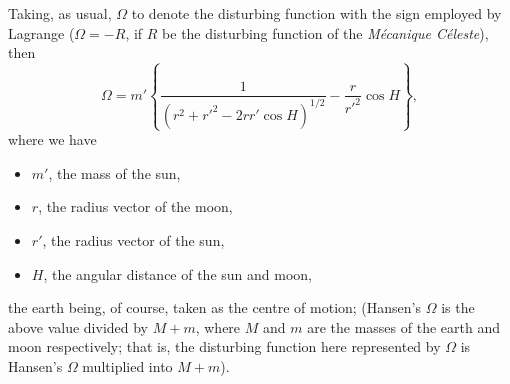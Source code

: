 \documentclass[11pt]{article}
\begin{document}
\medskip
\noindent Taking, as usual, $\Omega$ to denote the disturbing function with the sign employed by Lagrange ($\Omega = -R$, if $R$ be the disturbing function of the \textit{M\'ecanique C\'eleste}), then
\[
\Omega = m'\left\{\frac{1}{(r^{2}+r'^{2}-2rr'\cos H)^{1/2}} - \frac{r}{r'^{2}}\cos H\right\},
\]
where we have
\begin{itemize}
\item[] $m'$, the mass of the sun,
\item[] $r$, the radius vector of the moon,
\item[] $r'$, the radius vector of the sun,
\item[] $H$, the angular distance of the sun and moon,
\end{itemize}
the earth being, of course, taken as the centre of motion; (Hansen's $\Omega$ is the above value divided by $M+m$, where $M$ and $m$ are the masses of the earth and moon respectively; that is, the disturbing function here represented by $\Omega$ is Hansen's $\Omega$ multiplied into $M+m$).
\end{document}

